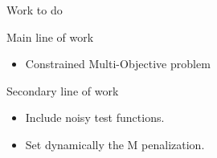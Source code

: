 \documentclass{beamer}
\begin{document}
\begin{frame}{Work to do}

Main line of work
\begin{itemize}
	\item Constrained Multi-Objective problem
\end{itemize}

Secondary line of work
\begin{itemize}
	\item Include noisy test functions.
	\item Set dynamically the M penalization.
\end{itemize}
\end{frame}
\end{document}
